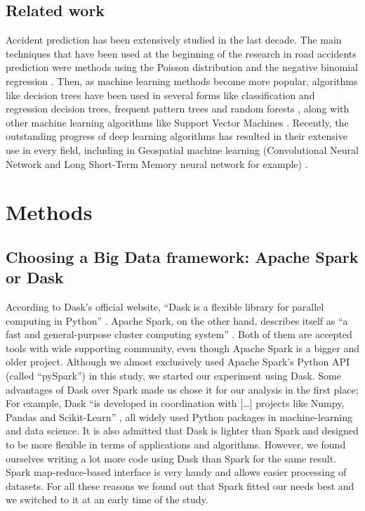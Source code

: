 \documentclass[conference]{IEEEtran}
\begin{document}
\subsection{Related work}
Accident prediction has been extensively studied in the last decade. The main techniques that have been used at the beginning of the research in road accidents prediction were methods using the Poisson distribution and the negative binomial regression \cite{Chang2005}. Then, as machine learning methods become more popular, algorithms like decision trees have been used in several forms like classification and regression decision trees, frequent pattern trees and random forests
\cite{Chang2005, Theofilatos2017, Abellan2013, Lin2015}, along with other machine learning algorithms like Support Vector Machines \cite{LI20081611}. Recently, the outstanding progress of deep learning algorithms has resulted in their extensive use in every field, including in Geospatial machine learning (Convolutional Neural Network and Long Short-Term Memory neural network for example) \cite{Yuan2018, QChen2016}.
\section{Methods}
\subsection{Choosing a Big Data framework: Apache Spark or Dask}
According to Dask’s official website, “Dask is a flexible library for parallel computing in Python” \cite{dask}. Apache Spark, on the other hand, describes itself as “a fast and general-purpose cluster computing system” \cite{spark}. Both of them are accepted tools with wide supporting community, even though Apache Spark is a bigger and older project. Although we almost exclusively used Apache Spark’s Python API (called “pySpark”) in this study, we started our experiment using Dask. Some advantages of Dask over Spark made us chose it for our analysis in the first place; For example, Dask “is developed in coordination with […] projects like Numpy, Pandas and Scikit-Learn” \cite{dask}, all widely used Python packages in machine-learning and data science. It is also admitted that Dask is lighter than Spark and designed to be more flexible in terms of applications and algorithms. However, we found ourselves writing a lot more code using Dask than Spark for the same result. Spark map-reduce-based interface is very handy and allows easier processing of datasets. For all these reasons we found out that Spark fitted our needs best and we switched to it at an early time of the study.
\end{document}
